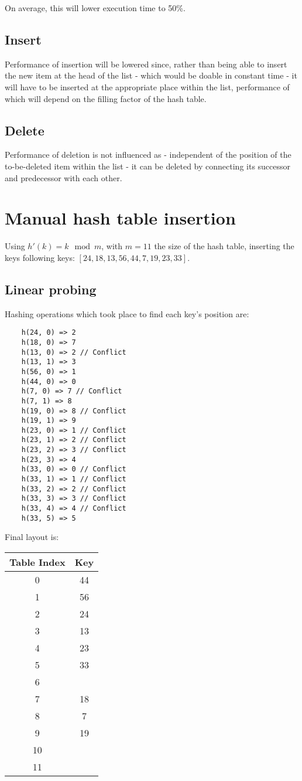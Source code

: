 \documentclass[a4paper]{scrartcl}
\begin{document}
On average, this will lower execution time to 50\%.

\subsection{Insert}

Performance of insertion will be lowered since, rather than being able to
insert the new item at the head of the list - which would be doable in constant
time - it will have to be inserted at the appropriate place within the list,
performance of which will depend on the filling factor of the hash table.

\subsection{Delete}

Performance of deletion is not influenced as - independent of the position of
the to-be-deleted item within the list - it can be deleted by connecting its
successor and predecessor with each other.

\section{Manual hash table insertion}

Using $h'(k) = k \mod m$, with $m = 11$ the size of the hash table, inserting
the keys following keys: $[24, 18, 13, 56, 44, 7, 19, 23, 33]$.

\subsection{Linear probing}

Hashing operations which took place to find each key's position are:

\begin{lstlisting}
	h(24, 0) => 2
	h(18, 0) => 7
	h(13, 0) => 2 // Conflict
	h(13, 1) => 3
	h(56, 0) => 1
	h(44, 0) => 0
	h(7, 0) => 7 // Conflict
	h(7, 1) => 8
	h(19, 0) => 8 // Conflict
	h(19, 1) => 9
	h(23, 0) => 1 // Conflict
	h(23, 1) => 2 // Conflict
	h(23, 2) => 3 // Conflict
	h(23, 3) => 4
	h(33, 0) => 0 // Conflict
	h(33, 1) => 1 // Conflict
	h(33, 2) => 2 // Conflict
	h(33, 3) => 3 // Conflict
	h(33, 4) => 4 // Conflict
	h(33, 5) => 5
\end{lstlisting}


Final layout is:

\begin{tabular}{|c|c|}
	\hline
	Table Index & Key \\
	\hline
	0 & 44 \\
	1 & 56 \\
	2 & 24 \\
	3 & 13 \\
	4 & 23 \\
	5 & 33 \\
	6 & \\
	7 & 18 \\
	8 & 7 \\
	9 & 19 \\
	10 & \\
	11 & \\
	\hline
\end{tabular}
\end{document}
